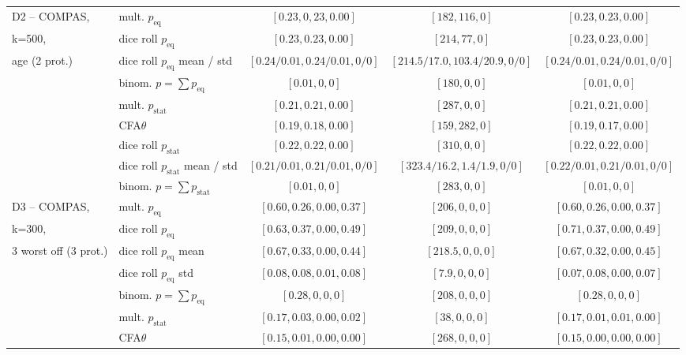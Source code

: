 \begin{table}[t!]
{\begin{tabular}{llccc}
			\midrule
			\midrule
			D2 -- COMPAS, 	& mult. \algoFAIR $p_{\text{eq}}$ 	& $[0.23, 0,23, 0.00]$ & $[182, 116, 0]$ 	& $[0.23, 0.23, 0.00]$ \\
			k=500, 			& dice roll $p_{\text{eq}}$ 	& $[0.23, 0.23, 0.00]$ & $[214, 77, 0]$ 	& $[0.23, 0.23, 0.00]$ \\
			age (2 prot.)	& dice roll $p_{\text{eq}}$ mean / std	& $[0.24 / 0.01, 0.24 / 0.01, 0 / 0]$ & $[214.5 / 17.0, 103.4 / 20.9, 0 / 0]$ 	& $[0.24 / 0.01, 0.24 / 0.01, 0 / 0]$ \\
							& binom. \algoFAIR $p = \sum p_{\text{eq}}$	& $[0.01,0,0]$	& $[180,0,0]$		& $[0.01,0,0]$  \\
							\cline{2-5}
							& mult. \algoFAIR $p_{\text{stat}}$ 	& $[0.21, 0.21, 0.00]$ & $[287, 0, 0]$ 		& $[0.21, 0.21, 0.00]$ \\
							& CFA$\theta$ 					& $[0.19, 0.18 ,0.00]$ & $[159, 282, 0]$ 	& $[0.19, 0.17, 0.00]$ \\ %
							& dice roll $p_{\text{stat}}$ 	& $[0.22, 0.22, 0.00]$ & $[310, 0, 0]$ 		& $[0.22, 0.22, 0.00]$ \\
							& dice roll $p_{\text{stat}}$ mean / std	& $[0.21 / 0.01, 0.21 / 0.01, 0 / 0]$ & $[323.4 / 16.2, 1.4 / 1.9, 0 / 0]$ 		& $[0.22 / 0.01, 0.21 / 0.01, 0 / 0]$ \\
							& binom. \algoFAIR $p = \sum p_{\text{stat}}$	& $[0.01,0,0]$		& $[283,0,0]$	& $[0.01,0,0]$ \\													
			\midrule
			\midrule
			D3 -- COMPAS, 		& mult. \algoFAIR  $p_{\text{eq}}$ 	& $[0.60, 0.26, 0.00, 0.37]$ 	& $[206, 0, 0, 0]$ 		& $[0.60, 0.26, 0.00, 0.37]$ \\
			k=300,				& dice roll $p_{\text{eq}}$ 	& $[0.63, 0.37, 0.00, 0.49]$ & $[209, 0, 0, 0]$ 	& $[0.71, 0.37, 0.00, 0.49]$ \\
			3 worst off (3 prot.)	& dice roll $p_{\text{eq}}$ mean	& $[0.67, 0.33, 0.00, 0.44]$ & $[218.5, 0, 0, 0]$ 	& $[0.67, 0.32, 0.00, 0.45]$ \\
								& dice roll $p_{\text{eq}}$ std	& $[0.08, 0.08, 0.01, 0.08]$ & $[7.9, 0, 0, 0]$ 	& $[0.07, 0.08, 0.00, 0.07]$ \\
								& binom. \algoFAIR $p = \sum p_{\text{eq}}$	& $[0.28,0,0, 0]$		& $[208,0,0, 0]$		& $[0.28,0,0, 0]$  \\
									\cline{2-5}
								& mult. \algoFAIR  $p_{\text{stat}}$ 	& $[0.17, 0.03, 0.00, 0.02]$ & $[38, 0, 0, 0]$ 				& $[0.17, 0.01,0.01, 0.00] $  \\
							 	& CFA$\theta$ 					& $[0.15, 0.01, 0.00, 0.00] $ & $[268, 0, 0, 0]$ 	& $[0.15, 0.00, 0.00, 0.00]$   \\

\end{tabular}}
\end{table}
